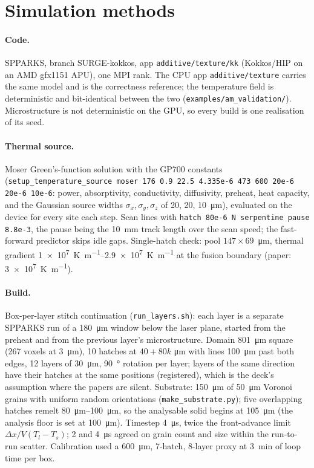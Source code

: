 \documentclass[11pt,a4paper]{article}
\newcommand{\code}[1]{\texttt{#1}}
\begin{document}
\section{Simulation methods}
\paragraph{Code.} SPPARKS, branch SURGE-kokkos, app \code{additive/texture/kk} (Kokkos/HIP on an AMD gfx1151 APU), one MPI rank. The CPU app \code{additive/texture} carries the same model and is the correctness reference; the temperature field is deterministic and bit-identical between the two (\code{examples/am\_validation/}). Microstructure is not deterministic on the GPU, so every build is one realisation of its seed.

\paragraph{Thermal source.} Moser Green's-function solution with the GP700 constants (\code{setup\_temperature\_source moser 176 0.9 22.5 4.335e-6 473 600 20e-6 20e-6 10e-6}: power, absorptivity, conductivity, diffusivity, preheat, heat capacity, and the Gaussian source widths $\sigma_x, \sigma_y, \sigma_z$ of 20, 20, \SI{10}{\micro\metre}), evaluated on the device for every site each step. Scan lines with \code{hatch 80e-6 N serpentine pause 8.8e-3}, the pause being the \SI{10}{\milli\metre} track length over the scan speed; the fast-forward predictor skips idle gaps. Single-hatch check: pool $147 \times 69$~\si{\micro\metre}, thermal gradient \SIrange{1e7}{2.9e7}{\kelvin\per\metre} at the fusion boundary (paper: \SI{3e7}{\kelvin\per\metre}).

\paragraph{Build.} Box-per-layer stitch continuation (\code{run\_layers.sh}): each layer is a separate SPPARKS run of a \SI{180}{\micro\metre} window below the laser plane, started from the preheat and from the previous layer's microstructure. Domain \SI{801}{\micro\metre} square (267 voxels at \SI{3}{\micro\metre}), 10 hatches at $40 + 80k$ \si{\micro\metre} with lines \SI{100}{\micro\metre} past both edges, 12 layers of \SI{30}{\micro\metre}, \SI{90}{\degree} rotation per layer; layers of the same direction have their hatches at the same positions (registered), which is the deck's assumption where the papers are silent. Substrate: \SI{150}{\micro\metre} of \SI{50}{\micro\metre} Voronoi grains with uniform random orientations (\code{make\_substrate.py}); five overlapping hatches remelt \SIrange{80}{100}{\micro\metre}, so the analysable solid begins at \SI{105}{\micro\metre} (the analysis floor is set at \SI{100}{\micro\metre}). Timestep \SI{4}{\micro\second}, twice the front-advance limit $\Delta x / V(T_l - T_s)$; 2 and \SI{4}{\micro\second} agreed on grain count and size within the run-to-run scatter. Calibration used a \SI{600}{\micro\metre}, 7-hatch, 8-layer proxy at \SI{3}{\minute} of loop time per box.
\end{document}
